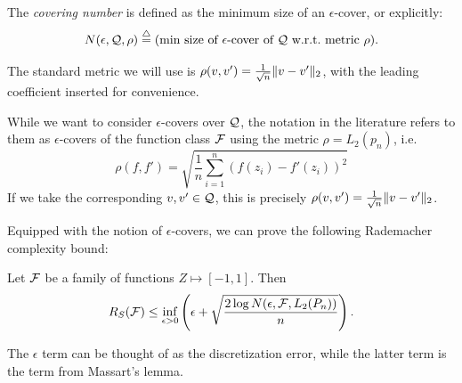 \begin{definition}
The \emph{covering number} is defined as the minimum size of an $\epsilon$-cover, or explicitly:
$$N(\epsilon, \mathcal Q, \rho) \overset \triangle = (\text{min size of $\epsilon$-cover of $\mathcal Q$ w.r.t.\ metric $\rho$}).$$
\end{definition}

The standard metric we will use is $\rho(v,v') = \frac 1 {\sqrt{n}} \|v-v'\|_2$, with the leading coefficient inserted for convenience.

\begin{remark}
While we want to consider $\epsilon$-covers over $\mathcal Q$, the notation in the literature refers to them as $\epsilon$-covers of the function class $\mathcal F$ using the metric $\rho = L_2(p_n)$, i.e.
\begin{equation}
\rho(f,f') = \sqrt{ \frac 1 n \sum_{i=1}^n (f(z_i) - f'(z_i))^2 }
\end{equation}
If we take the corresponding $v,v'\in \mathcal Q$, this is precisely $\rho(v,v') = \frac 1 {\sqrt{n}} \|v-v'\|_2$.
\end{remark}

Equipped with the notion of $\epsilon$-covers, we can prove the following Rademacher complexity bound:

\begin{theorem}\label{lec8:thm:rc-covering-bd}
Let $\mathcal F$ be a family of functions $Z \mapsto [-1,1]$. Then
\begin{equation}
R_S(\mathcal F) \le \inf_{\epsilon > 0} \left( \epsilon + \sqrt{ \frac {2\log N(\epsilon, \mathcal F, L_2(P_n))} n } \right). \label{lec8:eqn:rc-covering-bd}
\end{equation}
\end{theorem}

The $\epsilon$ term can be thought of as the discretization error, while the latter term is the term from Massart's lemma.

